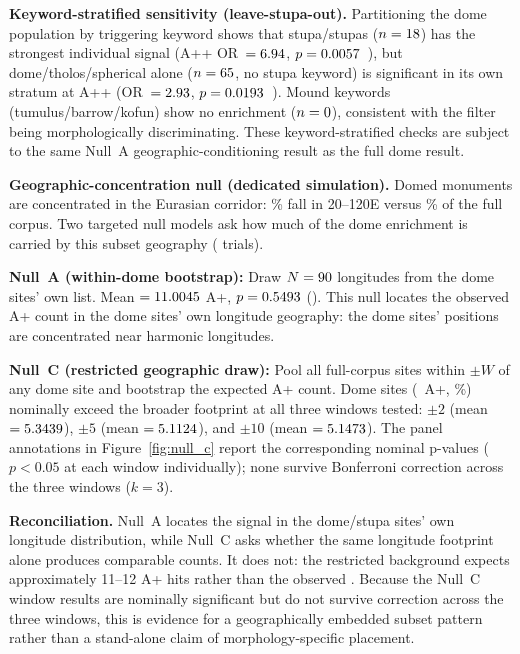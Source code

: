 \textbf{Keyword-stratified sensitivity (leave-stupa-out).}
Partitioning the dome population by triggering keyword shows that stupa/stupas
($n = 18$) has the strongest individual signal
(A++ OR~$= 6.94$, $p = 0.0057$~\kwSensStupaAppPSig{}),
but dome/tholos/spherical alone ($n = 65$, no stupa keyword)
is significant in its own stratum at A++
(OR~$= 2.93$, $p = 0.0193$~\kwSensNoStupaAppPSig{}).
Mound keywords (tumulus/barrow/kofun) show no enrichment ($n = 0$),
consistent with the filter being morphologically discriminating.
These keyword-stratified checks are subject to the same Null~A
geographic-conditioning result as the full dome result.

\textbf{Geographic-concentration null (dedicated simulation).}
\label{sec:geo_conc_null}
Domed monuments are concentrated in the Eurasian corridor:
\domeEurasianFraction\% fall in 20\textdegree--120\textdegree{}E
versus \fullCorpusEurasianFraction\% of the full corpus.
Two targeted null models ask how much of the dome enrichment is carried
by this subset geography (\simNperms{} trials).

\textbf{Null~A (within-dome bootstrap):} Draw $N = 90$ longitudes
from the dome sites' own list. Mean $= 11.0045$ A+,
$p = 0.5493$ (\geoNullDomeBootPSig{}). This null locates the
observed A+ count in the dome sites' own longitude geography: the dome
sites' positions are concentrated near harmonic longitudes.

\textbf{Null~C (restricted geographic draw):} Pool all full-corpus sites
within $\pm W$\textdegree{} of any dome site and bootstrap the expected A+
count. Dome sites (\NcircTierAp~A+, \NcircApRate\%) nominally exceed
the broader footprint at all three windows tested:
$\pm 2$\textdegree{} (mean $= 5.3439$),
$\pm 5$\textdegree{} (mean $= 5.1124$), and
$\pm 10$\textdegree{} (mean $= 5.1473$).
The panel annotations in Figure~\ref{fig:null_c} report the
corresponding nominal p-values ($p < 0.05$ at each window individually);
none survive Bonferroni correction across the three windows ($k = 3$).

\textbf{Reconciliation.}
Null~A locates the signal in the dome/stupa sites' own longitude
distribution, while Null~C asks whether the same longitude footprint
alone produces comparable counts. It does not: the restricted
background expects approximately 11--12 A+ hits rather than the
observed \NcircTierAp{}. Because the Null~C window results are nominally significant but
do not survive correction across the three windows, this
is evidence for a geographically embedded subset pattern rather than a
stand-alone claim of morphology-specific placement.

